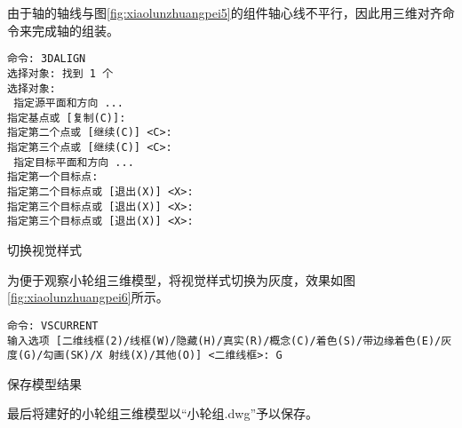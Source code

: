 \begin{procedure}
由于轴的轴线与图\ref{fig:xiaolunzhuangpei5}的组件轴心线不平行，因此用三维对齐命令来完成轴的组装。

\begin{lstlisting}
命令: 3DALIGN
选择对象: 找到 1 个
选择对象:
 指定源平面和方向 ...
指定基点或 [复制(C)]:
指定第二个点或 [继续(C)] <C>:
指定第三个点或 [继续(C)] <C>:
 指定目标平面和方向 ...
指定第一个目标点:
指定第二个目标点或 [退出(X)] <X>:
指定第三个目标点或 [退出(X)] <X>:
指定第三个目标点或 [退出(X)] <X>:
\end{lstlisting}

\item 切换视觉样式

为便于观察小轮组三维模型，将视觉样式切换为灰度，效果如图\ref{fig:xiaolunzhuangpei6}所示。

\begin{lstlisting}
命令: VSCURRENT
输入选项 [二维线框(2)/线框(W)/隐藏(H)/真实(R)/概念(C)/着色(S)/带边缘着色(E)/灰度(G)/勾画(SK)/X 射线(X)/其他(O)] <二维线框>: G
\end{lstlisting}
\item 保存模型结果

最后将建好的小轮组三维模型以“小轮组.dwg”予以保存。
\end{procedure}
\endinput